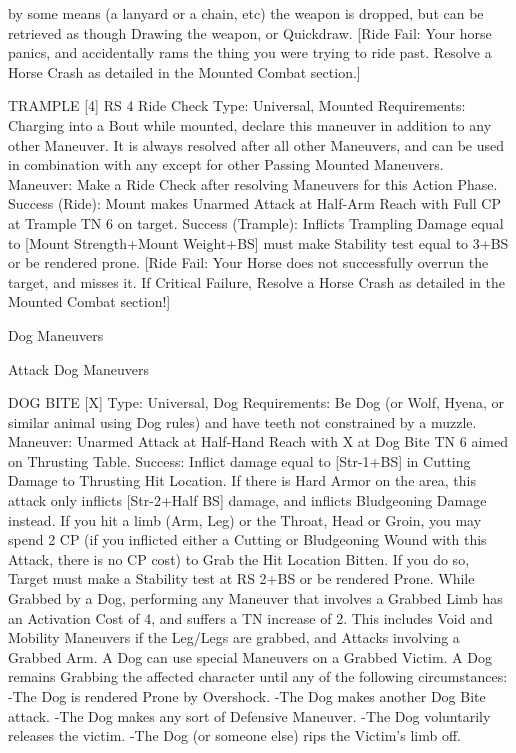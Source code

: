 \documentclass[oneside,11pt,english]{book}
\begin{document}
by some means (a lanyard or a chain, etc) the weapon is dropped, but can be retrieved as though Drawing 
the weapon, or Quickdraw. 
[Ride Fail: Your horse panics, and accidentally rams the thing you were trying to ride past. Resolve a 
Horse Crash as detailed in the Mounted Combat section.] 

 

TRAMPLE [4] {RS 4 Ride Check} 
Type: Universal, Mounted 
Requirements: Charging into a Bout while mounted, declare this maneuver in addition to any other 
Maneuver. It is always resolved after all other Maneuvers, and can be used in combination with any 
except for other Passing Mounted Maneuvers. 
Maneuver: Make a Ride Check after resolving Maneuvers for this Action Phase. 
Success (Ride): Mount makes Unarmed Attack at Half-Arm Reach with Full CP at Trample TN 6 on 
target. 
Success (Trample): Inflicts Trampling Damage equal to [Mount Strength+Mount Weight+BS] must make 
Stability test equal to 3+BS or be rendered prone. 
[Ride Fail: Your Horse does not successfully overrun the target, and misses it. If Critical Failure, Resolve 
a Horse Crash as detailed in the Mounted Combat section!] 

 

 

Dog Maneuvers 

 

Attack Dog Maneuvers 

 

DOG BITE [X] 
Type: Universal, Dog 
Requirements: Be Dog (or Wolf, Hyena, or similar animal using Dog rules) and have teeth not 
constrained by a muzzle. 
Maneuver: Unarmed Attack at Half-Hand Reach with X at Dog Bite TN 6 aimed on Thrusting Table. 
Success: Inflict damage equal to [Str-1+BS] in Cutting Damage to Thrusting Hit Location. If there is 
Hard Armor on the area, this attack only inflicts [Str-2+Half BS] damage, and inflicts Bludgeoning 
Damage instead. 
If you hit a limb (Arm, Leg) or the Throat, Head or Groin, you may spend 2 CP (if you inflicted either a 
Cutting or Bludgeoning Wound with this Attack, there is no CP cost) to Grab the Hit Location Bitten. If 
you do so, Target must make a Stability test at RS 2+BS or be rendered Prone. 
While Grabbed by a Dog, performing any Maneuver that involves a Grabbed Limb has an Activation 
Cost of 4, and suffers a TN increase of 2. This includes Void and Mobility Maneuvers if the Leg/Legs are 
grabbed, and Attacks involving a Grabbed Arm. A Dog can use special Maneuvers on a Grabbed Victim. 
A Dog remains Grabbing the affected character until any of the following circumstances: 
-The Dog is rendered Prone by Overshock. 
-The Dog makes another Dog Bite attack. 
-The Dog makes any sort of Defensive Maneuver. 
-The Dog voluntarily releases the victim. 
-The Dog (or someone else) rips the Victim’s limb off. 
\end{document}
